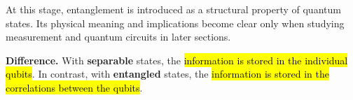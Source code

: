 \highspace
At this stage, entanglement is introduced as a structural property of quantum states. Its physical meaning and implications become clear only when studying measurement and quantum circuits in later sections.

\highspace
\textcolor{Green3}{ \textbf{Difference.}} With \textbf{separable} states, the \hl{information is stored in the individual qubits}. In contrast, with \textbf{entangled} states, the \hl{information is stored in the correlations between the qubits}.